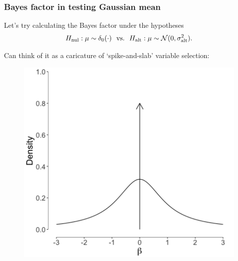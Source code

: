 \documentclass[18pt, handout]{beamer}
\newcommand{\defineTightSpacing}{%
	\setlength{\abovedisplayskip}{.25\baselineskip}%
	\setlength{\belowdisplayskip}{.25\baselineskip}%
}
\newcommand{\normalDist}{\operatorname{\mathcal{N}}}
\newcommand{\hypothesis}{H}
\newcommand{\nullSub}{\mathrm{nul}}
\newcommand{\altSub}{\mathrm{alt}}
\begin{document}
\begin{frame}
\frametitle{Bayes factor in testing Gaussian mean}
Let's try calculating the Bayes factor under the hypotheses
\begin{equation*} \defineTightSpacing%
\hypothesis_\nullSub: \mu \sim \delta_0(\cdot) 
	\ \text{ vs.\ } \ 
	\hypothesis_\altSub: \mu \sim \normalDist(0, \sigma_\altSub^2).
\end{equation*}

Can think of it as a caricature of `spike-and-slab' variable selection:
\vspace*{-1.2\baselineskip}%
\begin{figure}
\centering
\includegraphics[height=.5\paperheight]{Figure/spike_and_slab}
\end{figure}

\end{frame}
\end{document}
